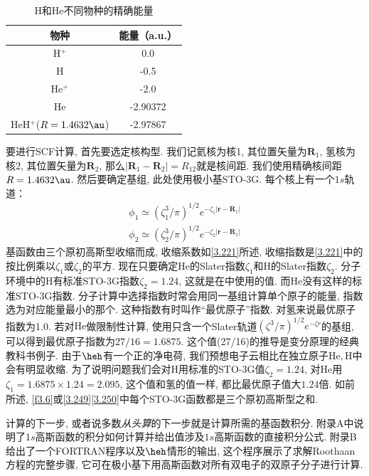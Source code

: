 \begin{table}[H]
	\centering
	\caption{H和He不同物种的精确能量}
	\begin{tabular}{cc}
		\hline
		物种 & 能量（a.u.）\\\hline
		H$^+$      & 0.0\\
		H     & -0.5\\
		He$^+$     & -2.0\\
		He     & -2.90372\\
		HeH$^+$($R = 1.4632\au$)&-2.97867\\\hline
	\end{tabular}
	\label{t3.4}
\end{table}
要进行SCF计算, 首先要选定核构型. 
我们记氦核为核1, 其位置矢量为$\mathbf{R}_1$, 
氢核为核2, 其位置矢量为$\mathbf{R}_2$, 
那么$|\mathbf{R}_1-\mathbf{R}_2|=R_{12}$就是核间距. 
我们使用精确核间距$R=1.4632\au$. 
然后要确定基组, 此处使用极小基STO-3G. 
每个核上有一个$1s$轨道：
\begin{align}
	\label{3.249}
	\phi_1 \simeq (\zeta_1^3/\pi)^{1/2} e^{-\zeta_1|\mathbf{r-R}_1|}\\
	\label{3.250}
	\phi_2 \simeq (\zeta_2^3/\pi)^{1/2} e^{-\zeta_2|\mathbf{r-R}_1|}
\end{align}
基函数由三个原初高斯型收缩而成, 
收缩系数如\autoref{3.221}所述, 
收缩指数是\autoref{3.221}中的按比例乘以$\zeta_1$或$\zeta_2$的平方. 
现在只要确定$\mathrm{He}$的Slater指数$\zeta_1$和$\mathrm{H}$的Slater指数$\zeta_2$. 
分子环境中的$\mathrm{H}$有标准STO-3G指数$\zeta_2=1.24$, 
这就是在中使用的值. 
而$\mathrm{He}$没有这样的标准STO-3G指数. 
分子计算中选择指数时常会用同一基组计算单个原子的能量, 
指数选为对应能量最小的那个. 
这种指数有时叫作``最优原子''指数. 
对氢来说最优原子指数为1.0. 
若对$\mathrm{He}$做限制性\hft 计算, 
使用只含一个Slater轨道$(\zeta^3/\pi)^{1/2}e^{-\zeta r}$的基组, 
可以得到最优原子指数为$27/16=1.6875$. 
这个值(27/16)的推导是变分原理的经典教科书例子.
由于$\heh$有一个正的净电荷, 
我们预想电子云相比在独立原子$\mathrm{He,H}$中会有明显收缩. 
为了说明问题我们会对$\mathrm{H}$用标准的STO-3G值$\zeta_2=1.24$, 
对$\mathrm{He}$用$\zeta_1=1.6875\times 1.24=2.095$, 
这个值和氢的值一样, 
都比最优原子值大$1.24$倍. 
如前所述, 
\autoref{f3.6}或\autoref{3.249}\autoref{3.250}中每个STO-3G函数都是三个原初高斯型之和.


计算的下一步, 
或者说多数\emph{从头算}的下一步就是计算所需的基函数积分. 
附录A中说明了$1s$高斯函数的积分如何计算并给出值涉及$1s$高斯函数的直接积分公式. 
附录B给出了一个FORTRAN程序以及$\heh$情形的输出, 
这个程序展示了求解Roothaan方程的完整步骤, 
它可在极小基下用高斯函数对所有双电子的双原子分子进行计算. 

